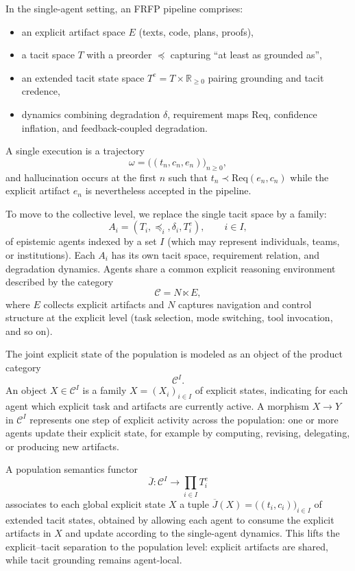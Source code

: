 \documentclass[11pt]{article}
\theoremstyle{definition}
\begin{document}
In the single-agent setting, an FRFP pipeline comprises:
\begin{itemize}
  \item an explicit artifact space $E$ (texts, code, plans, proofs),
  \item a tacit space $T$ with a preorder $\preceq$ capturing ``at least as
        grounded as'',
  \item an extended tacit state space $T^e = T \times \mathbb{R}_{\ge 0}$
        pairing grounding and tacit credence,
  \item dynamics combining degradation $\delta$, requirement maps
        $\mathrm{Req}$, confidence inflation, and feedback-coupled
        degradation.
\end{itemize}
A single execution is a trajectory
\[
  \omega = \bigl( (t_n,c_n,e_n) \bigr)_{n \ge 0},
\]
and hallucination occurs at the first $n$ such that
$t_n \prec \mathrm{Req}(e_n,c_n)$ while the explicit artifact $e_n$ is
nevertheless accepted in the pipeline.

To move to the collective level, we replace the single tacit space by a
family:
\[
  A_i = (T_i, \preceq_i, \delta_i, T^e_i),
  \qquad i \in I,
\]
of epistemic agents indexed by a set $I$ (which may represent individuals,
teams, or institutions). Each $A_i$ has its own tacit space, requirement
relation, and degradation dynamics. Agents share a common explicit
reasoning environment described by the category
\[
  \mathcal{C} = N \ltimes E,
\]
where $E$ collects explicit artifacts and $N$ captures navigation and
control structure at the explicit level (task selection, mode switching,
tool invocation, and so on).

The joint explicit state of the population is modeled as an object of the
product category
\[
  \mathcal{C}^I.
\]
An object $X \in \mathcal{C}^I$ is a family $X = (X_i)_{i\in I}$ of
explicit states, indicating for each agent which explicit task and artifacts
are currently active. A morphism $X \to Y$ in $\mathcal{C}^I$ represents
one step of explicit activity across the population: one or more agents
update their explicit state, for example by computing, revising, delegating,
or producing new artifacts.

A population semantics functor
\[
  \overline{J} : \mathcal{C}^I \longrightarrow \prod_{i\in I} T^e_i
\]
associates to each global explicit state $X$ a tuple
$\overline{J}(X) = \bigl((t_i,c_i)\bigr)_{i\in I}$ of extended tacit
states, obtained by allowing each agent to consume the explicit artifacts
in $X$ and update according to the single-agent dynamics. This lifts the
explicit--tacit separation to the population level: explicit artifacts are
shared, while tacit grounding remains agent-local.
\end{document}

